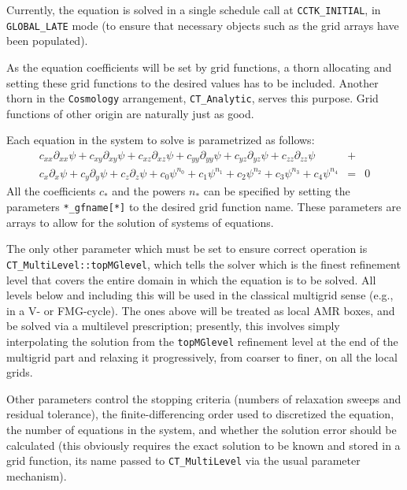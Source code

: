 Currently, the equation is solved in a single schedule call at 
\texttt{CCTK\_INITIAL}, in \texttt{GLOBAL\_LATE} mode (to ensure
that necessary objects such as the grid arrays have been populated).

As the equation coefficients will be set by grid functions, a thorn
allocating and setting these grid functions to the desired values
has to be included. Another thorn in the \texttt{Cosmology} arrangement,
\texttt{CT\_Analytic}, serves this purpose. Grid functions of other
origin are naturally just as good.

Each equation in the system to solve is parametrized as
follows:
\begin{eqnarray}
c_{xx} \partial_{xx} \psi + c_{xy} \partial_{xy} \psi + c_{xz} \partial_{xz} \psi + 
c_{yy} \partial_{yy} \psi + c_{yz} \partial_{yz} \psi + c_{zz} \partial_{zz} \psi &+& \\
c_{x} \partial_{x} \psi + c_{y} \partial_{y} \psi + c_{z} \partial_{z} \psi +
c_{0} \psi^{n_0} + c_{1} \psi^{n_1} + c_{2} \psi^{n_2} + c_{3} \psi^{n_3} + c_4 \psi^{n_4} &=& 0
\end{eqnarray}
All the coefficients $c_*$ and the powers $n_*$ can be specified by
setting the parameters \texttt{*\_gfname[*]} to the desired grid 
function name. These parameters are arrays to allow for the solution 
of systems of equations.

The only other parameter which must be set to ensure correct 
operation is \texttt{CT\_MultiLevel::topMGlevel}, which tells the
solver which is the finest refinement level that covers the entire
domain in which the equation is to be solved. All levels below and
including this will be used in the classical multigrid sense
(e.g., in a V- or FMG-cycle). The ones above will be treated as
local AMR boxes, and be solved via a multilevel prescription; 
presently, this involves simply interpolating the solution from
the \texttt{topMGlevel} refinement level at the end of the 
multigrid part and relaxing it progressively, from coarser to 
finer, on all the local grids. 

Other parameters control the stopping criteria (numbers of 
relaxation sweeps and residual tolerance), the finite-differencing 
order used to discretized the equation, the number of equations
in the system, and whether the solution error should be calculated
(this obviously requires the exact solution to be known and
stored in a grid function, its name passed to \texttt{CT\_MultiLevel}
via the usual parameter mechanism).

